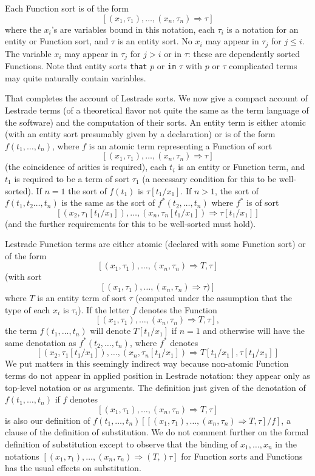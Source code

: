\documentclass{article}
\begin{document}
Each Function sort is of the form $$[(x_1,\tau_1),\ldots,(x_n,\tau_n) \Rightarrow \tau]$$  where the $x_i$'s are variables bound in this notation, each $\tau_i$ is a notation for an entity or Function sort, and $\tau$ is an entity sort.  No $x_i$ may appear in $\tau_j$ for $j\leq i$.  The variable $x_i$ may appear in $\tau_j$ for $j>i$ or in $\tau$:  these are dependently sorted Functions.  Note that entity sorts {\tt that} $p$ or {\tt in} $\tau$ with $p$ or $\tau$ complicated terms may quite naturally contain variables.

That completes the account of Lestrade sorts.  We now give a compact account of Lestrade terms (of a theoretical flavor not quite the same as the term language of the software) and the computation of their sorts.  An entity term is either atomic (with an entity  sort presumably given by a declaration) or is of the form $f(t_1,\ldots,t_n)$, where $f$ is an atomic term representing a Function of sort
$$[(x_1,\tau_1),\ldots,(x_n,\tau_n) \Rightarrow \tau]$$ (the coincidence of arities is required), each $t_i$ is an entity or Function term, and $t_1$ is required to be a term of sort $\tau_1$ (a necessary condition for this to be well-sorted).  If $n=1$ the sort
of $f(t_1)$ is $\tau[t_1/x_1]$.  If $n>1$, the sort of $f(t_1,t_2\ldots,t_n)$ is the same as the sort of $f^*(t_2,\ldots,t_n)$ where $f^*$ is of sort
$$[(x_2,\tau_1[t_1/x_1]),\ldots,(x_n,\tau_n[t_1/x_1]) \Rightarrow \tau[t_1/x_1]]$$ (and the further requirements for this to be well-sorted must hold).

Lestrade Function terms are either atomic (declared with some Function sort) or of the form $$[(x_1,\tau_1),\ldots,(x_n,\tau_n) \Rightarrow T,\tau]$$ (with sort  $$[(x_1,\tau_1),\ldots,(x_n,\tau_n) \Rightarrow \tau)]$$ where $T$ is an entity term of sort $\tau$ (computed under the assumption that the type of each $x_i$ is $\tau_i$).  If the letter $f$ denotes the Function $$[(x_1,\tau_1),\ldots,(x_n,\tau_n) \Rightarrow T,\tau],$$
the term $f(t_1,\ldots,t_n)$ will denote $T[t_1/x_1]$ if $n=1$ and otherwise will have the same denotation as $f^*(t_2,\ldots,t_n)$, where $f^*$ denotes
$$[(x_2,\tau_1[t_1/x_1]),\ldots,(x_n,\tau_n[t_1/x_1]) \Rightarrow T[t_1/x_1],\tau[t_1/x_1]]$$  We put matters in this seemingly indirect way because non-atomic Function terms do not appear in applied position in Lestrade notation:  they appear only as top-level notation or as arguments.  The definition just
given of the denotation of  $f(t_1,\ldots,t_n)$ if $f$ denotes  $$[(x_1,\tau_1),\ldots,(x_n,\tau_n) \Rightarrow T,\tau]$$ is also our definition of $f(t_1,\ldots,t_n)[[(x_1,\tau_1),\ldots,(x_n,\tau_n) \Rightarrow T,\tau]/f]$, a clause of the definition of substitution.  We do not comment further on the formal definition of substitution except to observe that the binding of $x_1,\ldots,x_n$ in the notations $[(x_1,\tau_1),\ldots,(x_n,\tau_n) \Rightarrow (T,)\tau]$ for Function sorts and Functions has the usual effects on substitution.
\end{document}
